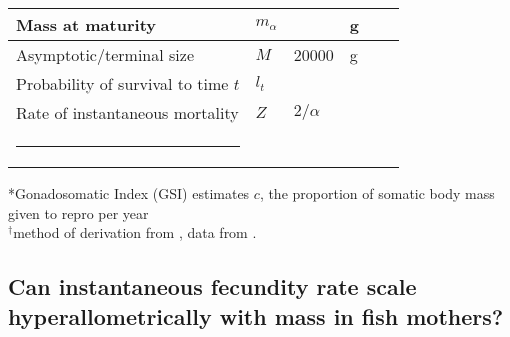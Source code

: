 \documentclass[a4paper]{article} %
\makeatletter
\newcommand{\thickhline}{%
    \noalign {\ifnum 0=`}\fi \hrule height 1pt
    \futurelet \reserved@a \@xhline
}
\makeatother
\begin{document}
\begin{table}[h]
\begin{tabularx}{\linewidth}{Xlllll}
    Mass at maturity                                        & $m_{\alpha}$          &                           & g                     &                                   &                       \\ \hline
    Asymptotic/terminal size                                & $M$                   & 20000              & g                     &                                   &                       \\ \hline
    Probability of survival to time $t$                     & $l_t$                 &                           & \textsc{}             &                                   &                       \\ \hline
    Rate of instantaneous mortality                         & $Z$                   & $2/\alpha$                &                       &                                   &                       \\ \thickhline
    \end{tabularx}
    \label{parameters}
\end{table}

*Gonadosomatic Index (GSI) estimates $c$, the proportion of somatic body mass given to repro per year\\
$^{\dagger}$method of derivation from \textcite{West2001}, data from \textcite{Cummins1971, Steimle1980}.
\subsection{Can instantaneous fecundity rate scale hyperallometrically with mass in fish mothers?}
\end{document}
